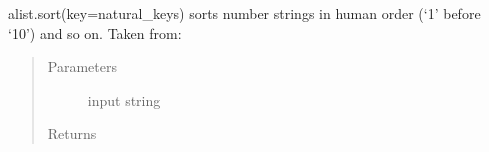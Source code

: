 \documentclass[letterpaper,10pt,english]{sphinxmanual}
\begin{document}

\begin{fulllineitems}
\label{\detokenize{autodocs/misc:listmode.misc.natural_keys}}
\sphinxAtStartPar
alist.sort(key=natural\_keys) sorts number strings in human order (‘1’ before ‘10’) and so on.
Taken from:
\begin{quote}\begin{description}
\item[{Parameters}] \leavevmode
\sphinxAtStartPar
{} \textendash{} input string

\item[{Returns}] \leavevmode
\sphinxAtStartPar


\end{description}\end{quote}

\end{fulllineitems}

\end{document}
